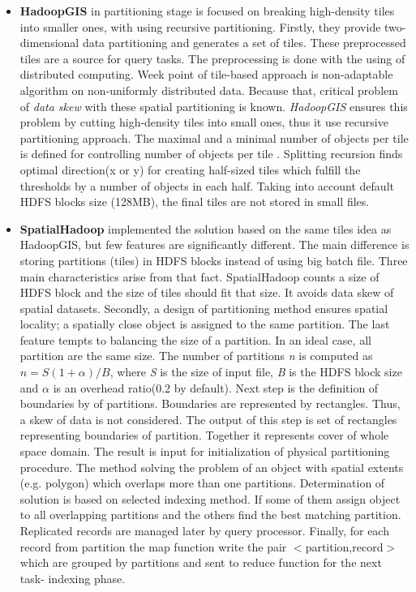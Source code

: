 \documentclass[a4paper,12pt,oneside]{report}
\begin{document}
\begin{itemize}
\item \textbf{HadoopGIS} in partitioning stage is focused on breaking high-density tiles into smaller ones, with using 
recursive partitioning. Firstly, they provide two-dimensional data partitioning and generates a set of tiles.
These preprocessed tiles are a source for query tasks. The preprocessing is done with the using of distributed computing.
Week point of tile-based approach is non-adaptable algorithm on non-uniformly distributed data. Because that, 
 critical problem of \textit{data skew} with these spatial partitioning is known. \textit{HadoopGIS} ensures 
this problem by cutting high-density tiles into small ones, thus it use recursive partitioning approach. The maximal and a minimal number of objects per tile is defined for controlling 
number of objects per tile . Splitting recursion 
finds optimal direction(x or y) for creating half-sized tiles which fulfill the thresholds by a number of objects 
in each half.  Taking into account default HDFS blocks size (128MB), the final tiles are not stored in small files.

\item  \textbf{SpatialHadoop} implemented the solution  based on the same tiles idea as HadoopGIS, but few features 
are significantly different.
The main difference is storing partitions (tiles) in HDFS blocks  instead of using big batch file. Three main characteristics arise from that fact. SpatialHadoop counts 
a size of HDFS block and the size of tiles should fit that size. It avoids data skew of spatial datasets. 
Secondly, a design of partitioning method ensures spatial locality; a spatially close object is assigned to the same 
partition. The last feature tempts to balancing the size of a partition. In an ideal case, all partition are the 
same size. The number of partitions \emph{n} is computed as $n=S(1+ \alpha)/B$,
where \emph{S} is the size of input file, \emph{B} is the HDFS block size and $\alpha$ is an overhead ratio(0.2 by default). 
Next step is the definition of boundaries by of partitions. Boundaries are represented by rectangles. Thus, a skew of data is not considered. 
The output of this step is set of rectangles representing  boundaries of partition. Together it represents cover 
of whole space domain. The result is input for initialization of physical partitioning procedure. The method solving 
the problem of an object with spatial extents (e.g. polygon) which overlaps more than one partitions. Determination 
of solution is based on selected indexing method. If some of them assign object to all overlapping partitions and 
the others find the best matching partition. Replicated records are managed later by  query processor. Finally, 
for each record from partition the map function write the pair $<$partition,record$>$ which are grouped by 
partitions and sent to reduce function for the next task- indexing phase.
\end{itemize}
\end{document}
